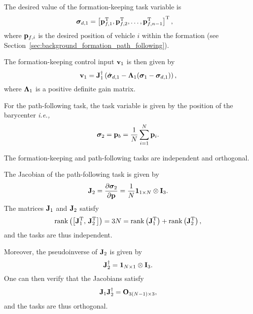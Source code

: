 The desired value of the formation-keeping task variable is
\begin{align}
    \bm{\sigma}_{d, 1} &= \left[\mathbf{p}_{f, 1}^{\mathrm{T}}, \mathbf{p}_{f, 2}^{\mathrm{T}}, \ldots, \mathbf{p}_{f, n-1}^{\mathrm{T}}\right]^{\mathrm{T}},
\end{align}
where $\mathbf{p}_{f, i}$ is the desired position of vehicle $i$ within the formation (see Section~\ref{sec:background_formation_path_following}).

The formation-keeping control input $\mathbf{v}_1$ is then given by
\begin{equation}
    \mathbf{v}_1 = \mathbf{J}_1^{\dagger} \left(\dot{\bm{\sigma}}_{d, 1} - \bm{\Lambda}_1 (\bm{\sigma}_1 - \bm{\sigma}_{d, 1})\right),
\end{equation}
where $\bm{\Lambda}_1$ is a positive definite gain matrix.

For the path-following task, the task variable is given by the position of the barycenter \emph{i.e.,}
\begin{equation}
    \bm{\sigma}_2 = \mathbf{p}_b = \frac{1}{N} \sum_{i=1}^{N} \mathbf{p}_i.
\end{equation}

\begin{rmk}
    The formation-keeping and path-following tasks are independent and orthogonal.

    \noindent The Jacobian of the path-following task is given by
    \begin{equation}
        \mathbf{J}_2 = \frac{\partial \bm{\sigma}_2}{\partial \mathbf{p}} = \frac{1}{N} \mathbf{1}_{1 \times N} \otimes \mathbf{I}_3.
    \end{equation}
    The matrices $\mathbf{J}_1$ and $\mathbf{J}_2$ satisfy
    \begin{equation}
        \operatorname*{rank} \left(\left[\mathbf{J}_1^{\mathrm{T}},\, \mathbf{J}_2^{\mathrm{T}}\right]\right) = 3N = \operatorname*{rank} \left(\mathbf{J}_1^{\mathrm{T}}\right) + \operatorname*{rank} \left(\mathbf{J}_2^{\mathrm{T}}\right),
    \end{equation}
    and the tasks are thus independent.

    Moreover, the pseudoinverse of $\mathbf{J}_2$ is given by
    \begin{equation}
        \mathbf{J}_2^{\dagger} = \mathbf{1}_{N \times 1} \otimes \mathbf{I}_3.
    \end{equation}
    One can then verify that the Jacobians satisfy
    \begin{equation}
        \mathbf{J}_1 \mathbf{J}_2^{\dagger} = \mathbf{O}_{3(N-1) \times 3},
    \end{equation}
    and the tasks are thus orthogonal.
\end{rmk}

